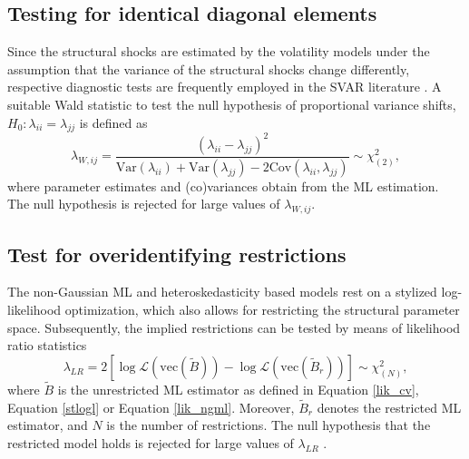 \documentclass[nojss]{jss}\usepackage[]{graphicx}\usepackage[]{color}
\begin{document}
\subsection{Testing for identical diagonal elements}
Since the structural shocks are estimated by the volatility models under the assumption that the variance of the structural shocks change differently, respective diagnostic tests are frequently  employed in the SVAR literature \citep[see, e.g.,][]{HerwartzPloedt2016, LV2016, LUTKEPOHL20172}. A suitable  Wald statistic to test the
null hypothesis of proportional variance shifts, $H_0:\lambda_{ii} = \lambda_{jj}$
is defined as
\begin{equation}
\lambda_{W, ij} = \frac{(\lambda_{ii} - \lambda_{jj})^2}{\mbox{Var}(\lambda_{ii}) + \mbox{Var}(\lambda_{jj}) - 2\mbox{Cov}(\lambda_{ii}, \lambda_{jj})} \sim \chi^2_{(2)},
\end{equation}
where parameter estimates and (co)variances obtain from the ML estimation. The null hypothesis is rejected for large values of $\lambda_{W, ij}$.

\subsection{Test for overidentifying restrictions}\label{test:LR}
The non-Gaussian ML and heteroskedasticity based models rest on a stylized log-likelihood optimization, which also allows for  restricting the structural parameter space. Subsequently, the implied restrictions can be tested by means of likelihood ratio statistics
\begin{equation}
\lambda_{LR} = 2\left[\log \mathcal{L}\left(\mbox{vec}(\widetilde{B})\right) - \log \mathcal{L}\left(\mbox{vec}(\widetilde{B}_r)\right)\right] \sim \chi^2_{(N)},
\end{equation}
where $\widetilde{B}$ is the unrestricted ML estimator as defined in Equation \ref{lik_cv},  Equation \ref{stlogl} or Equation \ref{lik_ngml}. Moreover, $\widetilde{B}_r$ denotes the restricted ML estimator, and $N$ is the number of restrictions. The null hypothesis that the restricted model holds is rejected for large values of $\lambda_{LR}$ \citep{IntroductionMultipleTS}.
\end{document}
